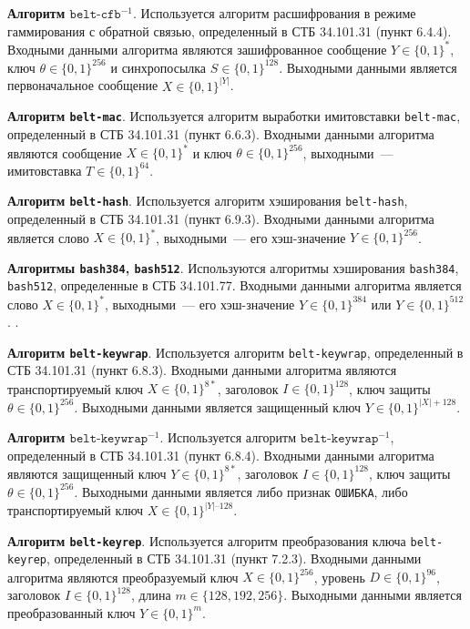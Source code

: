 {\bf Алгоритм $\texttt{belt-cfb}^{-1}$}.
Используется алгоритм расшифрования в режиме 
гаммирования с обратной связью, определенный в СТБ 34.101.31 (пункт 
6.4.4). Входными данными алгоритма являются зашифрованное 
сообщение $Y\in\{0,1\}^*$, ключ $\theta\in\{0,1\}^{256}$ 
и синхропосылка $S\in\{0,1\}^{128}$. Выходными 
данными является первоначальное сообщение $X\in\{0,1\}^{|Y|}$.

{\bf Алгоритм \texttt{belt-mac}}.
Используется алгоритм выработки имитовставки \texttt{belt-mac}, 
определенный в СТБ 34.101.31 (пункт 6.6.3). Входными данными алгоритма 
являются сообщение $X\in\{0,1\}^*$ и ключ $\theta\in\{0,1\}^{256}$, 
выходными~--- имитовставка $T\in\{0,1\}^{64}$.

{\bf Алгоритм \texttt{belt-hash}}.
Используется алгоритм хэширования \texttt{belt-hash},
определенный в СТБ 34.101.31 (пункт 6.9.3). Входными данными алгоритма 
является слово $X\in\{0,1\}^*$, выходными~--- 
его хэш-значение $Y\in\{0,1\}^{256}$.

{\bf Алгоритмы \texttt{bash384}, \texttt{bash512}}.
Используются алгоритмы хэширования \texttt{bash384}, \texttt{bash512},
определенные в СТБ 34.101.77. Входными данными алгоритма 
является слово $X\in\{0,1\}^*$, выходными~--- 
его хэш-значение $Y\in\{0,1\}^{384}$ или $Y\in\{0,1\}^{512}$.
%
.

{\bf Алгоритм \texttt{belt-keywrap}}.
Используется алгоритм \texttt{belt-keywrap}, определенный в 
СТБ 34.101.31 (пункт 6.8.3). Входными данными алгоритма являются 
транспортируемый ключ $X\in\{0,1\}^{8*}$, 
заголовок $I\in\{0,1\}^{128}$, ключ защиты $\theta\in\{0,1\}^{256}$.
Выходными данными является защищенный ключ $Y\in\{0,1\}^{|X|+128}$.

{\bf Алгоритм $\texttt{belt-keywrap}^{-1}$}.
Используется алгоритм $\texttt{belt-keywrap}^{-1}$, определенный 
в СТБ 34.101.31 (пункт 6.8.4). Входными данными алгоритма являются 
защищенный ключ $Y\in\{0,1\}^{8*}$, заголовок $I\in\{0,1\}^{128}$, 
ключ защиты $\theta\in\{0,1\}^{256}$. Выходными данными является либо признак 
\texttt{ОШИБКА}, либо транспортируемый ключ $X\in\{0,1\}^{|Y|–128}$.

{\bf Алгоритм \texttt{belt-keyrep}}.
Используется алгоритм преобразования ключа 
\texttt{belt-keyrep}, определенный в СТБ 34.101.31 (пункт 7.2.3).
Входными данными алгоритма являются преобразуемый ключ $X\in\{0,1\}^{256}$, 
уровень $D\in\{0,1\}^{96}$, заголовок $I\in\{0,1\}^{128}$, 
длина $m\in\{128,192,256\}$. Выходными данными 
является преобразованный ключ $Y\in\{0,1\}^{m}$.

